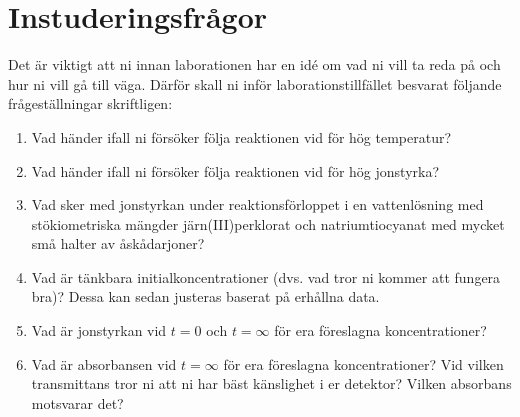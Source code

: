 \section{Instuderingsfrågor}
\label{sec:instudering}
Det är viktigt att ni innan laborationen har en idé om vad ni vill ta
reda på och hur ni vill gå till väga. Därför skall ni inför
laborationstillfället besvarat följande frågeställningar skriftligen:

\begin{enumerate}
\item Vad händer ifall ni försöker följa reaktionen vid för hög
  temperatur?
\item Vad händer ifall ni försöker följa reaktionen vid för hög
  jonstyrka?
\item Vad sker med jonstyrkan under reaktionsförloppet i en vattenlösning
  med stökiometriska mängder järn(III)perklorat och natriumtiocyanat med
  mycket små halter av åskådarjoner?
\item Vad är tänkbara initialkoncentrationer (dvs. vad tror ni kommer att
  fungera bra)? Dessa kan sedan justeras baserat på erhållna data.
\item Vad är jonstyrkan vid $t=0$ och $t=\infty$ för era föreslagna
  koncentrationer?
\item Vad är absorbansen vid $t=\infty$ för era föreslagna
  koncentrationer? Vid vilken transmittans tror ni att ni har bäst
  känslighet i er detektor? Vilken absorbans motsvarar det?
\end{enumerate}

